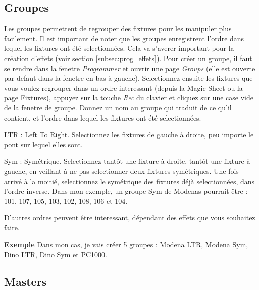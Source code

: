 \subsection{Groupes}
\label{subsec:prep_groupes}

Les groupes permettent de regrouper des fixtures pour les manipuler plus facilement.
\newline
Il est important de noter que les groupes enregistrent l'ordre dans lequel les fixtures ont été selectionnées.
Cela va s'averer important pour la création d'effets (voir section \ref{subsec:prog_effets}).
\newline
\newline
Pour créer un groupe, il faut se rendre dans la fenetre \textit{Programmer} et ouvrir une page \textit{Groups}
(elle est ouverte par defaut dans la fenetre en bas à gauche).
\newline
Selectionnez ensuite les fixtures que vous voulez regrouper dans un ordre interessant (depuis la Magic Sheet ou la page Fixtures), appuyez sur la touche \textit{Rec} du clavier et cliquez sur une case vide de la fenetre de groupe.
Donnez un nom au groupe qui traduit de ce qu'il contient, et l'ordre dans lequel les fixtures ont été selectionnées.
\newline
\newline
\begin{list}{-}{Ordres de selection utiles :}
    \item LTR : Left To Right. Selectionnez les fixtures de gauche à droite, peu importe le pont sur lequel elles sont.
    \item Sym : Symétrique. Selectionnez tantôt une fixture à droite, tantôt une fixture à gauche, en veillant à ne pas selectionner
deux fixtures symétriques. Une fois arrivé à la moitié, selectionnez le symétrique des fixtures déjà selectionnées, dans l'ordre inverse.
\newline
Dans mon exemple, un groupe Sym de Modenas pourrait être : 101, 107, 105, 103, 102, 108, 106 et 104.
    \item D'autres ordres peuvent être interessant, dépendant des effets que vous souhaitez faire.
\end{list}
\textbf{Exemple}
\newline
\newline
Dans mon cas, je vais créer 5 groupes : Modena LTR, Modena Sym, Dino LTR, Dino Sym et PC1000.

\subsection{Masters}
\label{subsec:prep_gm}

